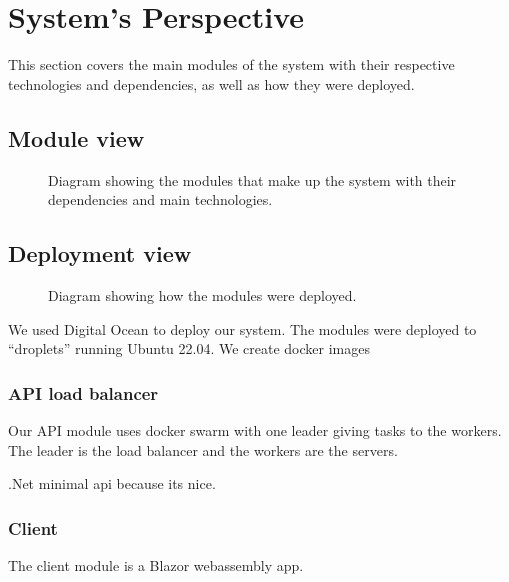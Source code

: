 \section{System's Perspective}
\label{ch:sys_persp} %

This section covers the main modules of the system with their  
respective technologies and dependencies, as well as how they
were deployed.

\subsection{Module view}

\begin{figure}[H]
    \centering
    
    \caption{Diagram showing the modules that make up the system with
    their dependencies and main technologies.}
    \label{fig:modules}
\end{figure}

\subsection{Deployment view}

\begin{figure}[H]
      \centering
      
      \caption{Diagram showing how the modules were deployed.}
      \label{fig:deployment_diagram}
\end{figure}

We used Digital Ocean to deploy our system.
The modules were deployed to ``droplets'' running Ubuntu 22.04.
We create docker images 

\subsubsection{API load balancer}

Our API module uses docker swarm with one leader giving tasks 
to the workers. The leader is the load balancer 
and the workers are the servers. 

.Net minimal api because its nice.

\subsubsection{Client}

The client module is a Blazor webassembly app.

